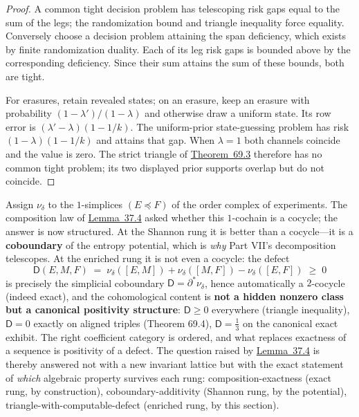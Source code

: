 \begin{proof}

A common tight decision problem has telescoping risk gaps equal to the sum of the legs; the randomization bound and triangle inequality force equality. Conversely choose a decision problem attaining the span deficiency, which exists by finite randomization duality. Each of its leg risk gaps is bounded above by the corresponding deficiency. Since their sum attains the sum of these bounds, both are tight.

For erasures, retain revealed states; on an erasure, keep an erasure with probability \((1-\lambda')/(1-\lambda)\) and otherwise draw a uniform state. Its row error is \((\lambda'-\lambda)(1-1/k)\). The uniform-prior state-guessing problem has risk \((1-\lambda)(1-1/k)\) and attains that gap. When \(\lambda=1\) both channels coincide and the value is zero. The strict triangle of \hyperlink{stmt:69.3}{Theorem~69.3} therefore has no common tight problem; its two displayed prior supports overlap but do not coincide.
\end{proof}

\begin{thmrem}

Assign \(\nu_\delta\) to the \(1\)-simplices \((E \preceq F)\) of the order complex of experiments. The composition law of \hyperlink{stmt:37.4}{Lemma~37.4} asked whether this \(1\)-cochain is a cocycle; the answer is now structured. At the Shannon rung it is better than a cocycle---\hspace{0pt}it is a \textbf{coboundary} of the entropy potential, which is \emph{why} Part VII's decomposition telescopes. At the enriched rung it is not even a cocycle: the defect
\[
\mathsf{D}(E, M, F) \;=\; \nu_\delta([E,M]) + \nu_\delta([M,F]) - \nu_\delta([E,F]) \;\ge\; 0
\]
is precisely the simplicial coboundary \(\mathsf{D} = \partial^* \nu_\delta\), hence automatically a \(2\)-cocycle (indeed exact), and the cohomological content is \textbf{not a hidden nonzero class but a canonical positivity structure}: \(\mathsf{D} \ge 0\) everywhere (triangle inequality), \(\mathsf{D} = 0\) exactly on aligned triples (Theorem 69.4), \(\mathsf{D} = \tfrac13\) on the canonical exact exhibit. The right coefficient category is ordered, and what replaces exactness of a sequence is positivity of a defect. The question raised by \hyperlink{stmt:37.4}{Lemma~37.4} is thereby answered not with a new invariant lattice but with the exact statement of \emph{which} algebraic property survives each rung: composition-exactness (exact rung, by construction), coboundary-additivity (Shannon rung, by the potential), triangle-with-computable-defect (enriched rung, by this section).
\end{thmrem}


